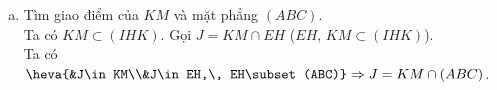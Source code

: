 \begin{bt}
{\begin{enumerate}[a)]
			$$\heva{&F\in BC\\&F\in EH, \, EH\subset (IHK)}\Rightarrow F=BC\cap (IHK).$$
			Gọi $D$ là trung điểm của $SC$, ta có $IK$ là đường trung bình của $\triangle SAD$.\\
			Trong $\triangle CEK$ có $\dfrac{CA}{AE}=\dfrac{CD}{DK}=2\Rightarrow CA=2CK$.\\
			Trong mặt phẳng $(ABC)$ kẻ $AN\parallel EF$ ($N\in BC$).
			Ta có
			\begin{eqnarray*}
				&& HF\parallel AN\Rightarrow \dfrac{BH}{HA}=\dfrac{BF}{FN}=1\Rightarrow BF=FN.\\
				&& EF\parallel AN\Rightarrow \dfrac{CA}{AE}=\dfrac{CN}{NF}=2\Rightarrow CN=2NF.
			\end{eqnarray*}
			Do đó $\dfrac{FB}{FC}=\dfrac{FB}{FN+NC}=\dfrac{FB}{3FB}=\dfrac{1}{3}$.
			\item Tìm giao điểm của $KM$ và mặt phẳng $(ABC)$.\\
			Ta có $KM\subset (IHK)$. Gọi $J=KM\cap EH$ ($ EH,\, KM\subset (IHK)$).\\
			Ta có $\heva{&J\in KM\\&J\in EH,\, EH\subset (ABC)}\Rightarrow J=KM\cap (ABC)$.
		\end{enumerate}
	}
\end{bt}